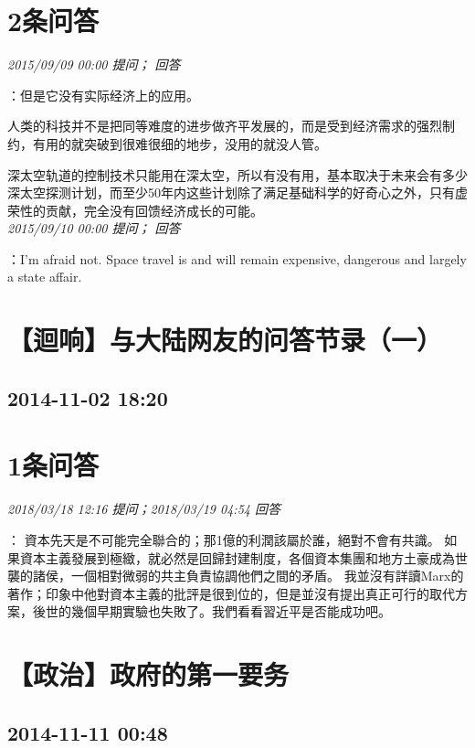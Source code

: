 \documentclass[twocolumn]{ctexart}
\begin{document}
\section{2条问答}

\textit{\hfill\noindent\small 2015/09/09 00:00 提问； 回答}

：但是它没有实际经济上的应用。

人类的科技并不是把同等难度的进步做齐平发展的，而是受到经济需求的强烈制约，有用的就突破到很难很细的地步，没用的就没人管。

深太空轨道的控制技术只能用在深太空，所以有没有用，基本取决于未来会有多少深太空探测计划，而至少50年内这些计划除了满足基础科学的好奇心之外，只有虚荣性的贡献，完全没有回馈经济成长的可能。\\

\textit{\hfill\noindent\small 2015/09/10 00:00 提问； 回答}

：I'm afraid not. Space travel is and will remain expensive, dangerous and largely a state affair.\\


\section{【迴响】与大陆网友的问答节录（一）}
\subsection{2014-11-02 18:20}


\section{1条问答}

\textit{\hfill\noindent\small 2018/03/18 12:16 提问；2018/03/19 04:54 回答}

：
資本先天是不可能完全聯合的；那1億的利潤該屬於誰，絕對不會有共識。
如果資本主義發展到極緻，就必然是回歸封建制度，各個資本集團和地方土豪成為世襲的諸侯，一個相對微弱的共主負責協調他們之間的矛盾。
我並沒有詳讀Marx的著作；印象中他對資本主義的批評是很到位的，但是並沒有提出真正可行的取代方案，後世的幾個早期實驗也失敗了。我們看看習近平是否能成功吧。
\\


\section{【政治】政府的第一要务 }
\subsection{2014-11-11 00:48}
\end{document}
